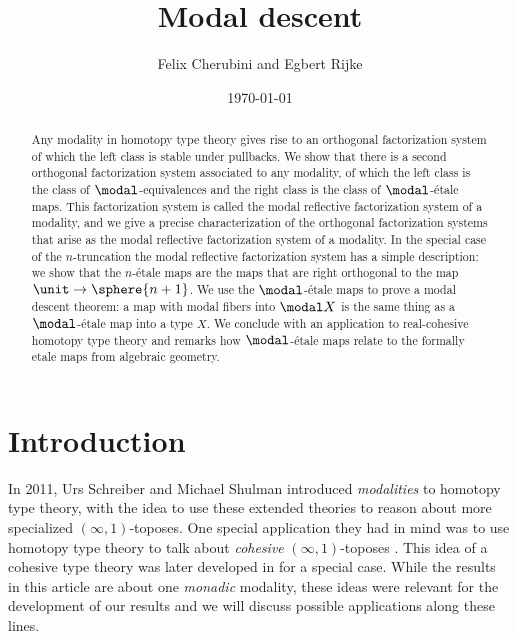 \documentclass{msc}
\title{Modal descent}
\author{Felix Cherubini and Egbert Rijke}
\date{\today}
\begin{document}
\maketitle

\begin{abstract}
  Any modality in homotopy type theory gives rise to an orthogonal factorization system of which the left class is stable under pullbacks. We show that there is a second orthogonal factorization system associated to any modality, of which the left class is the class of $\modal$-equivalences and the right class is the class of $\modal$-\'etale maps. This factorization system is called the modal reflective factorization system of a modality, and we give a precise characterization of the orthogonal factorization systems that arise as the modal reflective factorization system of a modality. In the special case of the $n$-truncation the modal reflective factorization system has a simple description: we show that the $n$-\'etale maps are the maps that are right orthogonal to the map $\unit \to \sphere{n+1}$. We use the $\modal$-\'etale maps to prove a modal descent theorem: a map with modal fibers into $\modal X$ is the same thing as a $\modal$-\'etale map into a type $X$. We conclude with an application to real-cohesive homotopy type theory and remarks how $\modal$-étale maps relate to the formally etale maps from algebraic geometry. 
\end{abstract}

\section{Introduction}
In 2011, Urs Schreiber and Michael Shulman introduced \emph{modalities} to homotopy type theory,
with the idea to use these extended theories to reason about more specialized $(\infty,1)$-toposes.
One special application they had in mind was to use homotopy type theory to talk about \emph{cohesive} $(\infty,1)$-toposes \cite{ShulmanSchreiber}.
This idea of a cohesive type theory was later developed in \cite{ShulmanRealCohesion} for a special case.
While the results in this article are about one \emph{monadic} modality,
these ideas were relevant for the development of our results and we will discuss possible applications along these lines.
  
\end{document}
